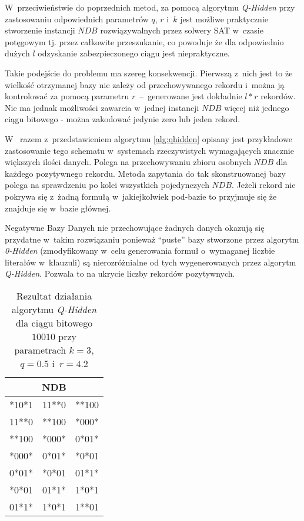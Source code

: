 W~przeciwieństwie do poprzednich metod, za pomocą algorytmu \textit{Q-Hidden} przy zastosowaniu odpowiednich
parametrów $q$, $r$ i~$k$ jest możliwe praktycznie stworzenie instancji $NDB$ rozwiązywalnych przez solwery SAT 
w~czasie potęgowym tj. przez całkowite przeszukanie, co powoduje że dla odpowiednio dużych $l$ odzyskanie 
zabezpieczonego ciągu jest niepraktyczne.

Takie podejście do problemu ma szereg konsekwencji. Pierwszą z~nich jest to że wielkość otrzymanej bazy
nie zależy od przechowywanego rekordu i~można ją kontrolować za pomocą parametru $r$~--~generowane
jest dokładnie $l * r$ rekordów. Nie ma jednak możliwości zawarcia w~jednej instancji $NDB$ 
więcej niż jednego ciągu bitowego - można zakodować jedynie zero lub jeden rekord.

W~\cite{HARD-NDB} razem z~przedstawieniem algorytmu \ref{alg:qhidden} opisany jest przykładowe zastosowanie tego schematu 
w~systemach rzeczywistych wymagających znacznie większych ilości danych. Polega na przechowywaniu zbioru osobnych $NDB$ 
dla każdego pozytywnego rekordu. Metoda zapytania do tak skonstruowanej bazy polega na sprawdzeniu po kolei wszystkich pojedynczych $NDB$.
Jeżeli rekord nie pokrywa się z~żadną formułą w~jakiejkolwiek pod-bazie to przyjmuje się że znajduje się w~bazie głównej.

Negatywne Bazy Danych nie przechowujące żadnych danych okazują się przydatne w~takim rozwiązaniu ponieważ \enquote{puste} bazy stworzone
przez algorytm \textit{0-Hidden} (zmodyfikowany w~celu generowania formuł o~wymaganej liczbie literałów w~klauzuli) są nierozróżnialne
od tych wygenerowanych przez algorytm \textit{Q-Hidden}. Pozwala to na ukrycie liczby rekordów pozytywnych.

\begin{table}[!tb]
    \centering
    \begin{tabular}{|lll|}
        \hline
        \multicolumn{3}{|c|}{NDB} \\ \hline
        *10*1 & 11**0 & **100 \\
        11**0 & **100 & *000* \\
        **100 & *000* & 0*01* \\
        *000* & 0*01* & *0*01 \\
        0*01* & *0*01 & 01*1* \\
        *0*01 & 01*1* & 1*0*1 \\
        01*1* & 1*0*1 & 1**01 \\
        \hline
    \end{tabular}
    \caption{Rezultat działania algorytmu \textit{Q-Hidden} dla ciągu bitowego $10010$ przy parametrach $k=3$, $q=0.5$ i~$r=4.2$}
    \label{tbl:qhidden_results}
\end{table}


